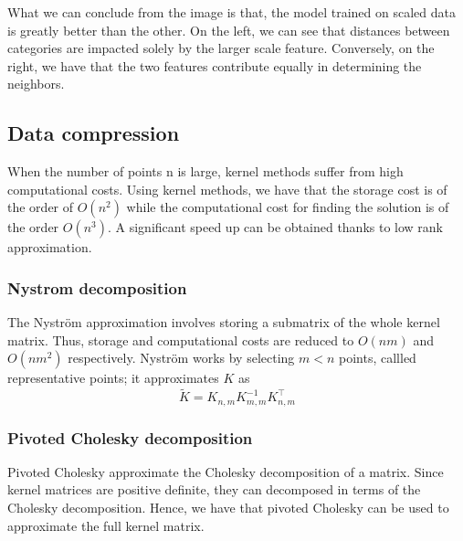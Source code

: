 What we can conclude from the image is that, the model trained on scaled data is greatly better than the other.
On the left, we can see that distances between categories are impacted solely by the larger scale feature. Conversely, on the right, we have that the two features contribute equally in determining the neighbors.

\subsection{Data compression}
When the number of points n is large, kernel methods suffer from high computational costs. 
Using kernel methods, we have that the storage cost is of the order of $O(n^2)$ while the computational cost for finding the solution is of the order $O(n^3)$.
A significant speed up can be obtained thanks to low rank approximation.


\subsubsection{Nystrom decomposition}
The Nyström approximation involves storing a submatrix of the whole kernel matrix. Thus, storage and computational costs are reduced to $O(nm)$ and $O(nm^2)$ respectively.
Nyström works by selecting $m<n$ points, callled representative points; it approximates $K$ as
\begin{equation}
    \tilde {K}=K_{n,m} K_{m,m}^{-1}K_{n,m}^\intercal
\end{equation}


\subsubsection{Pivoted Cholesky decomposition}
Pivoted Cholesky approximate the Cholesky decomposition of a matrix. Since kernel matrices are positive definite, they can decomposed in terms of the Cholesky decomposition. Hence, we have that pivoted Cholesky can be used to approximate the full kernel matrix.


\newpage

